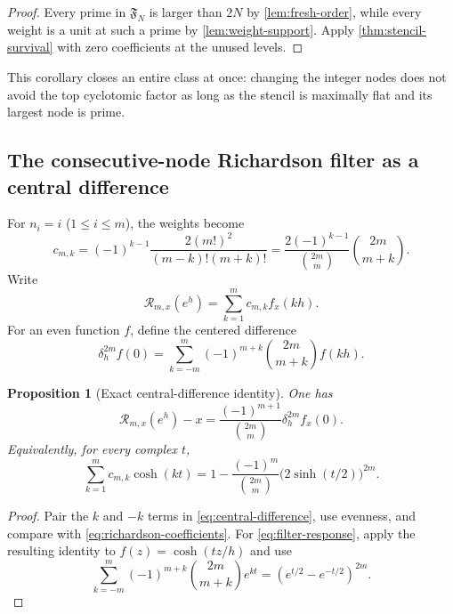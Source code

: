 \documentclass[11pt]{article}
\newtheorem{proposition}[theorem]{Proposition}
\theoremstyle{definition}
\begin{document}
\begin{proof}
Every prime in $\mathfrak F_N$ is larger than $2N$ by
\cref{lem:fresh-order}, while every weight is a unit at such a prime by
\cref{lem:weight-support}.  Apply \cref{thm:stencil-survival} with zero
coefficients at the unused levels.
\end{proof}

This corollary closes an entire class at once: changing the integer nodes does
not avoid the top cyclotomic factor as long as the stencil is maximally flat
and its largest node is prime.

\subsection{The consecutive-node Richardson filter as a central difference}

For $n_i=i$ ($1\le i\le m$), the weights become
\begin{equation}
 c_{m,k}=(-1)^{k-1}\frac{2(m!)^2}{(m-k)!(m+k)!}
 =\frac{2(-1)^{k-1}}{\binom{2m}{m}}
 \binom{2m}{m+k}.
 \label{eq:richardson-coefficients}
\end{equation}
Write
\[
 \mathcal R_{m,x}(e^h)=\sum_{k=1}^m c_{m,k}f_x(kh).
\]
For an even function $f$, define the centered difference
\begin{equation}
 \delta_h^{2m}f(0)
 =\sum_{k=-m}^m(-1)^{m+k}\binom{2m}{m+k}f(kh).
 \label{eq:central-difference}
\end{equation}

\begin{proposition}[Exact central-difference identity]
\label{prop:central-difference}
One has
\begin{equation}
 \boxed{
 \mathcal R_{m,x}(e^h)-x
 =\frac{(-1)^{m+1}}{\binom{2m}{m}}
 \delta_h^{2m}f_x(0).
 }
 \label{eq:central-richardson}
\end{equation}
Equivalently, for every complex $t$,
\begin{equation}
 \boxed{
 \sum_{k=1}^m c_{m,k}\cosh(kt)
 =1-\frac{(-1)^m}{\binom{2m}{m}}
 \bigl(2\sinh(t/2)\bigr)^{2m}.
 }
 \label{eq:filter-response}
\end{equation}
\end{proposition}

\begin{proof}
Pair the $k$ and $-k$ terms in \eqref{eq:central-difference}, use evenness,
and compare with \eqref{eq:richardson-coefficients}.  For
\eqref{eq:filter-response}, apply the resulting identity to $f(z)=\cosh(tz/h)$
and use
\[
 \sum_{k=-m}^m(-1)^{m+k}\binom{2m}{m+k}e^{kt}
 =(e^{t/2}-e^{-t/2})^{2m}.
\]
\end{proof}
\end{document}
